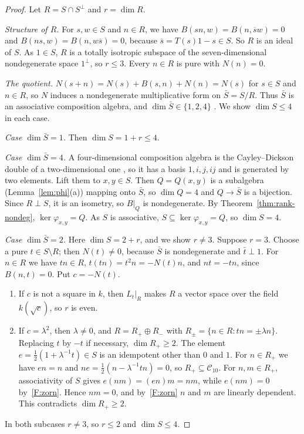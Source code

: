 \documentclass[11pt]{amsart}
\theoremstyle{definition}
\theoremstyle{remark}
\newcommand{\C}{\mathcal{C}}
\newcommand{\conj}[1]{\overline{#1}}
\begin{document}
\begin{proof}
Let $R=S\cap S^\perp$ and $r=\dim R$.

\emph{Structure of $R$.} For $s,w\in S$ and $n\in R$, we have
$B(sn,w)=B(n,\conj sw)=0$ and $B(ns,w)=B(n,w\conj s)=0$, because
$\conj s=T(s)1-s\in S$. So $R$ is an ideal of $S$. As $1\in S$, $R$ is a
totally isotropic subspace of the seven-dimensional nondegenerate space
$1^\perp$, so $r\le3$. Every $n\in R$ is pure with $N(n)=0$.

\emph{The quotient.} $N(s+n)=N(s)+B(s,n)+N(n)=N(s)$ for $s\in S$ and $n\in R$, so
$N$ induces a nondegenerate multiplicative form on $\bar S=S/R$. Thus $\bar S$
is an associative composition algebra, and $\dim\bar S\in\{1,2,4\}$
\cite{hurwitz1898,springer2000}. We show $\dim S\le4$ in each case.

\emph{Case $\dim\bar S=1$.} Then $\dim S=1+r\le4$.

\emph{Case $\dim\bar S=4$.} A four-dimensional composition algebra is the
Cayley--Dickson double of a two-dimensional one \cite[Ch.~1]{springer2000},
so it has a basis $1,i,j,ij$ and is generated by two elements. Lift them to $x,y\in S$. Then $Q=Q(x,y)$ is a subalgebra
(Lemma~\ref{lem:phi}(a)) mapping onto $\bar S$, so $\dim Q=4$ and
$Q\to\bar S$ is a bijection. Since $R\perp S$, it is an isometry, so $B|_Q$ is
nondegenerate. By Theorem~\ref{thm:rank-nondeg}, $\ker\varphi_{x,y}=Q$. As $S$
is associative, $S\subseteq\ker\varphi_{x,y}=Q$, so $\dim S=4$.

\emph{Case $\dim\bar S=2$.} Here $\dim S=2+r$, and we show $r\neq3$. Suppose
$r=3$. Choose a pure $t\in S\setminus R$; then $N(t)\neq0$, because $\bar S$ is
nondegenerate and $\bar t\perp1$. For $n\in R$ we have $tn\in R$,
$t(tn)=t^2n=-N(t)n$, and $nt=-tn$, since $B(n,t)=0$. Put $c=-N(t)$.
\begin{enumerate}[label=\textup{(\alph*)}]
\item If $c$ is not a square in $k$, then $L_t|_R$ makes $R$ a vector space
  over the field $k(\sqrt c)$, so $r$ is even.
\item If $c=\lambda^2$, then $\lambda\neq0$, and $R=R_+\oplus R_-$ with
  $R_\pm=\{n\in R:tn=\pm\lambda n\}$. Replacing $t$ by $-t$ if necessary,
  $\dim R_+\ge2$. The element $e=\tfrac12(1+\lambda^{-1}t)\in S$ is an
  idempotent other than $0$ and $1$. For $n\in R_+$ we have $en=n$ and
  $ne=\tfrac12(n-\lambda^{-1}tn)=0$, so $R_+\subseteq\C_{10}$. For
  $n,m\in R_+$, associativity of $S$ gives $e(nm)=(en)m=nm$, while
  $e(nm)=0$ by~\ref{F:zorn}. Hence $nm=0$, and by~\ref{F:zorn} $n$ and $m$
  are linearly dependent. This contradicts $\dim R_+\ge2$.
\end{enumerate}
In both subcases $r\neq3$, so $r\le2$ and $\dim S\le4$.
\end{proof}
\end{document}
